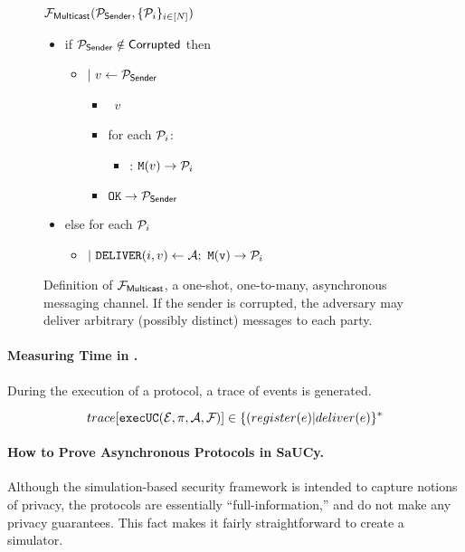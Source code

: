 \begin{figure}[h!]
\begin{boxedminipage}{\columnwidth}
\begin{centering}
\textbf{$\F{Multicast}(\P_{\msf{Sender}}, \Ps)$} \\\end{centering}
\small
\begin{itemize}[leftmargin=2mm]
\item[] if $\P_{\msf{Sender}} \notin \msf{Corrupted}$ then
  \begin{itemize}[leftmargin=2mm]
  \item[] $|~ v \leftarrow \P_{\msf{Sender}}$
    \begin{itemize}[leftmargin=2mm]
    \item[]  ~$v$
    \item[] for each $\P_i$: 
      \begin{itemize}[leftmargin=2mm]
      \item[] : $\mtt{M}(v) \rightarrow \P_i$
      \end{itemize}
    \item[] $\mtt{OK} \rightarrow \P_\msf{Sender}$
    \end{itemize}
  \end{itemize}
\item[] else for each $\P_i$
  \begin{itemize}[leftmargin=2mm]
  \item[] $|~ \mtt{DELIVER}(i,v) \leftarrow \A;~
    \mtt{\mtt{M}(v)} \rightarrow \P_i$
  \end{itemize}
\end{itemize}
\end{boxedminipage}
\caption{
\label{fig:multicast}
Definition of $\F{Multicast}$, a one-shot, one-to-many, asynchronous messaging channel. If the sender is corrupted, the adversary may deliver arbitrary (possibly distinct) messages to each party.
}
\end{figure}

\paragraph{Measuring Time in \SaUCy.}
During the execution of a protocol, a trace of events is generated.

\[
 trace[ \execUC{\Z}{\pi}{\A}{\F{}} ] \in \{ (register(e) | deliver(e) \}^*
\]


\paragraph{How to Prove Asynchronous Protocols in SaUCy.}
Although the simulation-based security framework is intended to capture notions of privacy, the protocols are essentially ``full-information,'' and do not make any privacy guarantees. This fact makes it fairly straightforward to create a simulator. 

